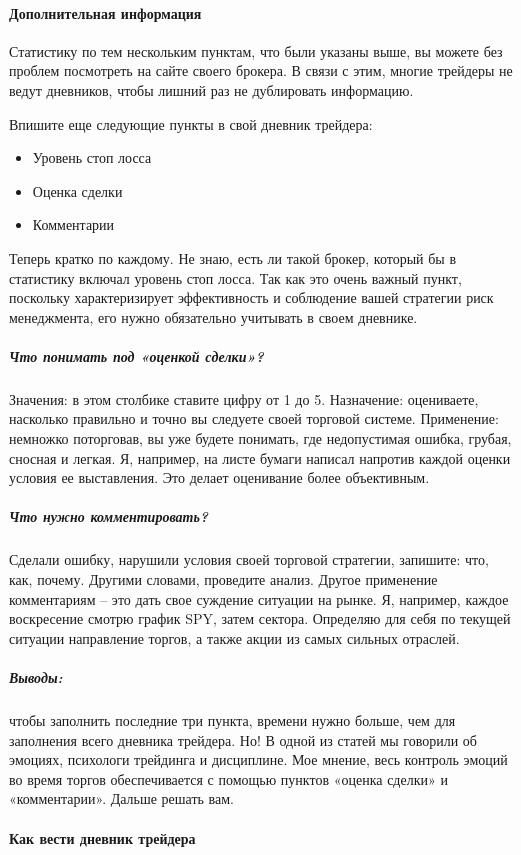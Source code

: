 \documentclass[a5paper]{article}
\begin{document}
\paragraph{Дополнительная информация}

Статистику по тем нескольким пунктам, что были указаны выше, вы можете без проблем посмотреть на сайте своего брокера. В связи с этим, многие трейдеры не ведут дневников, чтобы лишний раз не дублировать информацию.

Впишите еще следующие пункты в свой дневник трейдера:
\begin{itemize}
\item     Уровень стоп лосса
\item     Оценка сделки
\item     Комментарии
\end{itemize}

Теперь кратко по каждому. Не знаю, есть ли такой брокер, который бы в статистику включал уровень стоп лосса. Так как это очень важный пункт, поскольку характеризирует эффективность и соблюдение вашей стратегии риск менеджмента, его нужно обязательно учитывать в своем дневнике.

\subparagraph{Что понимать под «оценкой сделки»?} Значения: в этом столбике ставите цифру от 1 до 5. Назначение: оцениваете, насколько правильно и точно вы следуете своей торговой системе. Применение: немножко поторговав, вы уже будете понимать, где недопустимая ошибка, грубая, сносная и легкая. Я, например, на листе бумаги написал напротив каждой оценки условия ее выставления. Это делает оценивание более объективным.

\subparagraph{Что нужно комментировать? }Сделали ошибку, нарушили условия своей торговой стратегии, запишите: что, как, почему. Другими словами, проведите анализ. Другое применение комментариям – это дать свое суждение ситуации на рынке. Я, например, каждое воскресение смотрю график SPY, затем сектора. Определяю для себя по текущей ситуации направление торгов, а также акции из самых сильных отраслей.

\subparagraph{Выводы:} чтобы заполнить последние три пункта, времени нужно больше, чем для заполнения всего дневника трейдера. Но! В одной из статей мы говорили об эмоциях, психологи трейдинга и дисциплине. Мое мнение, весь контроль эмоций во время торгов обеспечивается с помощью пунктов «оценка сделки» и «комментарии». Дальше решать вам.

\paragraph{Как вести дневник трейдера}
\end{document}
